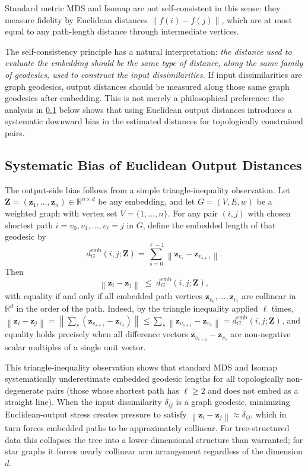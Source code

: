 \documentclass[11pt]{article}
\newcommand{\R}{\mathbb{R}}
\newcommand{\bz}{\mathbf{z}}
\newcommand{\bZ}{\mathbf{Z}}
\newcommand{\norm}[1]{\left\|#1\right\|}
\newcommand{\demb}{d^{\mathrm{emb}}}
\begin{document}
Standard metric MDS and Isomap are not self-consistent in this sense:
they measure fidelity by Euclidean distances $\norm{f(i) - f(j)}$, which
are at most equal to any path-length distance through intermediate vertices.

The self-consistency principle has a natural interpretation:
\emph{the distance used to evaluate the embedding should be the same
type of distance, along the same family of geodesics, used to construct
the input dissimilarities.}
If input dissimilarities are graph geodesics, output distances should be
measured along those same graph geodesics after embedding.  This is not
merely a philosophical preference: the
analysis in \cref{sec:systematic_bias} below shows that using Euclidean
output distances introduces a systematic downward bias in the estimated
distances for topologically constrained pairs.

\subsection{Systematic Bias of Euclidean Output Distances}
\label{sec:systematic_bias}

The output-side bias follows from a simple triangle-inequality
observation.  Let $\bZ = (\bz_1, \ldots, \bz_n) \in \R^{n \times d}$ be
any embedding, and let $G = (V, E, w)$ be a weighted graph with vertex
set $V = \{1, \ldots, n\}$.  For any pair $(i,j)$ with chosen shortest
path $i = v_0, v_1, \ldots, v_\ell = j$ in $G$, define the embedded
length of that geodesic by
\begin{equation}
  \demb_G(i,j;\bZ)
  = \sum_{s=0}^{\ell-1} \norm{\bz_{v_s} - \bz_{v_{s+1}}}.
  \label{eq:emb_geo}
\end{equation}
Then
\begin{equation}
  \norm{\bz_i - \bz_j} \;\leq\; \demb_G(i,j;\bZ),
  \label{eq:triangle_bias}
\end{equation}
with equality if and only if all embedded path vertices
$\bz_{v_0}, \ldots, \bz_{v_\ell}$ are collinear in $\R^d$ in the order
of the path.  Indeed, by the triangle inequality applied $\ell$ times,
$\norm{\bz_i - \bz_j} = \norm{\sum_{s} (\bz_{v_{s+1}} - \bz_{v_s})}
\leq \sum_s \norm{\bz_{v_{s+1}} - \bz_{v_s}} = \demb_G(i,j;\bZ)$, and
equality holds precisely when all difference vectors
$\bz_{v_{s+1}} - \bz_{v_s}$ are non-negative scalar multiples of a single
unit vector.

This triangle-inequality observation shows that standard MDS and Isomap systematically
underestimate embedded geodesic lengths for all topologically
non-degenerate pairs (those whose shortest path has $\ell \geq 2$ and
does not embed as a straight line).  When the input dissimilarity
$\delta_{ij}$ is a graph geodesic, minimizing Euclidean-output stress
creates pressure to satisfy $\norm{\bz_i - \bz_j} \approx \delta_{ij}$,
which in turn forces embedded paths to be approximately collinear.
For tree-structured data this collapses the tree into a lower-dimensional
structure than warranted; for star graphs it forces nearly collinear arm
arrangement regardless of the dimension $d$.
\end{document}
